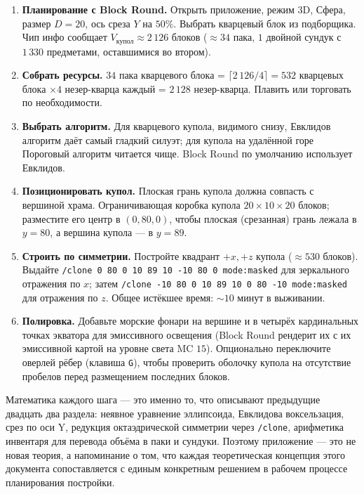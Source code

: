 \documentclass[12pt,a4paper]{scrartcl}
\newcommand{\code}[1]{\texttt{\small #1}}
\newcommand{\cmd}[1]{\textcolor{earth}{\texttt{\small #1}}}
\begin{document}
\begin{enumerate}[leftmargin=1.6em,itemsep=0.3em,topsep=0.3em]
  \item \textbf{Планирование с Block Round.} Открыть приложение, режим 3D, Сфера, размер $D=20$, ось среза $Y$ на $50\%$. Выбрать кварцевый блок из подборщика. Чип инфо сообщает $V_{\mathrm{купол}} \approx 2\,126$ блоков ($\approx 34$ пака, $1$ двойной сундук с $1\,330$ предметами, оставшимися во втором).
  \item \textbf{Собрать ресурсы.} $34$ пака кварцевого блока = $\lceil 2\,126/4 \rceil = 532$ кварцевых блока $\times 4$ незер-кварца каждый = $2\,128$ незер-кварца. Плавить или торговать по необходимости.
  \item \textbf{Выбрать алгоритм.} Для кварцевого купола, видимого снизу, Евклидов алгоритм даёт самый гладкий силуэт; для купола на удалённой горе Пороговый алгоритм читается чище. Block Round по умолчанию использует Евклидов.
  \item \textbf{Позиционировать купол.} Плоская грань купола должна совпасть с вершиной храма. Ограничивающая коробка купола $20 \times 10 \times 20$ блоков; разместите его центр в $(0,80,0)$, чтобы плоская (срезанная) грань лежала в $y=80$, а вершина купола — в $y=89$.
  \item \textbf{Строить по симметрии.} Постройте квадрант $+x, +z$ купола ($\approx 530$ блоков). Выдайте \cmd{/clone 0 80 0 10 89 10 -10 80 0 mode:masked} для зеркального отражения по $x$; затем \cmd{/clone -10 80 0 10 89 10 0 80 -10 mode:masked} для отражения по $z$. Общее истёкшее время: $\sim 10$ минут в выживании.
  \item \textbf{Полировка.} Добавьте морские фонари на вершине и в четырёх кардинальных точках экватора для эмиссивного освещения (Block Round рендерит их с их эмиссивной картой на уровне света MC $15$). Опционально переключите оверлей рёбер (клавиша \code{G}), чтобы проверить оболочку купола на отсутствие пробелов перед размещением последних блоков.
\end{enumerate}

Математика каждого шага — это именно то, что описывают предыдущие двадцать два раздела: неявное уравнение эллипсоида, Евклидова воксельзация, срез по оси Y, редукция октаэдрической симметрии через \cmd{/clone}, арифметика инвентаря для перевода объёма в паки и сундуки. Поэтому приложение — это не новая теория, а напоминание о том, что каждая теоретическая концепция этого документа сопоставляется с единым конкретным решением в рабочем процессе планирования постройки.
\end{document}
